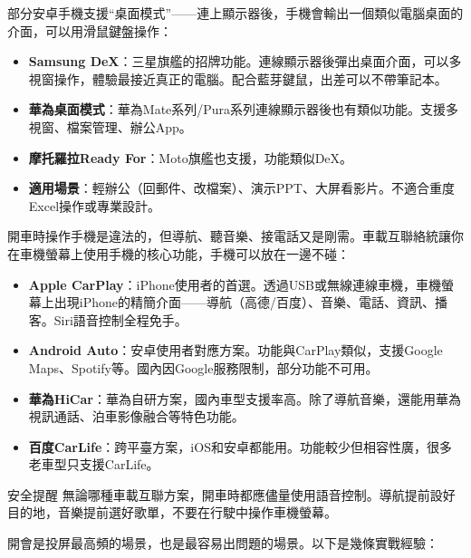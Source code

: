 
部分安卓手機支援“桌面模式”——連上顯示器後，手機會輸出一個類似電腦桌面的介面，可以用滑鼠鍵盤操作：

\begin{itemize}
  \item \textbf{Samsung DeX}：三星旗艦的招牌功能。連線顯示器後彈出桌面介面，可以多視窗操作，體驗最接近真正的電腦。配合藍芽鍵鼠，出差可以不帶筆記本。
  \item \textbf{華為桌面模式}：華為Mate系列/Pura系列連線顯示器後也有類似功能。支援多視窗、檔案管理、辦公App。
  \item \textbf{摩托羅拉Ready For}：Moto旗艦也支援，功能類似DeX。
  \item \textbf{適用場景}：輕辦公（回郵件、改檔案）、演示PPT、大屏看影片。不適合重度Excel操作或專業設計。
\end{itemize}


開車時操作手機是違法的，但導航、聽音樂、接電話又是剛需。車載互聯絡統讓你在車機螢幕上使用手機的核心功能，手機可以放在一邊不碰：

\begin{itemize}
  \item \textbf{Apple CarPlay}：iPhone使用者的首選。透過USB或無線連線車機，車機螢幕上出現iPhone的精簡介面——導航（高德/百度）、音樂、電話、資訊、播客。Siri語音控制全程免手。
  \item \textbf{Android Auto}：安卓使用者對應方案。功能與CarPlay類似，支援Google Maps、Spotify等。國內因Google服務限制，部分功能不可用。
  \item \textbf{華為HiCar}：華為自研方案，國內車型支援率高。除了導航音樂，還能用華為視訊通話、泊車影像融合等特色功能。
  \item \textbf{百度CarLife}：跨平臺方案，iOS和安卓都能用。功能較少但相容性廣，很多老車型只支援CarLife。
\end{itemize}

\begin{tcbwarn}{安全提醒}
無論哪種車載互聯方案，開車時都應儘量使用語音控制。導航提前設好目的地，音樂提前選好歌單，不要在行駛中操作車機螢幕。

\end{tcbwarn}


開會是投屏最高頻的場景，也是最容易出問題的場景。以下是幾條實戰經驗：

